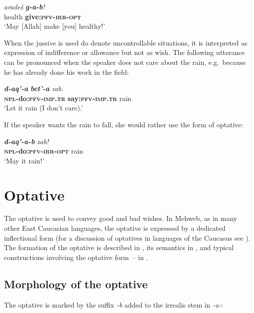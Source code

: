 ﻿\documentclass[output=paper]{langsci/langscibook}
\begin{document}
\ex \label{ex:5:101} %
\gll \emph{aradeš} \emph{\textbf{g-a-b}!}\\
health \textbf{give:\textsc{pfv}-\textsc{irr}-\textsc{opt}}\\
\glt `May [Allah] make [you] healthy!'
\z

When the jussive is used do denote uncontrollable situations, it is
interpreted as expression of indifference or allowance but not as wish.
The following utterance can be pronounced when the speaker does not care
about the rain, e.g.\ because he has already done his work in the field:

\ea %
\gll \emph{\textbf{d-aq'-a}} \emph{\textbf{bet'-a}}  \emph{zab.}\\
 \textbf{\textsc{npl}-do:\textsc{pfv}-\textsc{imp}.\textsc{tr}} \textbf{say:\textsc{pfv}-\textsc{imp}.\textsc{tr}} rain\\
\glt `Let it rain (I don't care).'
\z

If the speaker wants the rain to fall, she would rather use the form of
optative:

\ea %
\gll \emph{\textbf{d-aq'-a-b}} \emph{zab!}\\
\textbf{\textsc{npl}-do:\textsc{pfv}-\textsc{irr}-\textsc{opt}} rain\\
\glt `May it rain!'
\z


\removelastskip
{}

\section{Optative}\label{optative}


The optative is used to convey good and bad wishes. In Mehweb, as in
many other East Caucasian languages, the optative is expressed by a
dedicated inflectional form (for a discussion of optatives in languages
of the Caucasus see \citealt{dobrushina2011}). The formation of the optative is
described in , its semantics in , and typical
constructions involving the optative form~– in .

\subsection{Morphology of the optative}\label{morphology-of-the-optative}

The optative is marked by the suffix \emph{-b} added to the irrealis
stem in \emph{-a-}:
\end{document}
